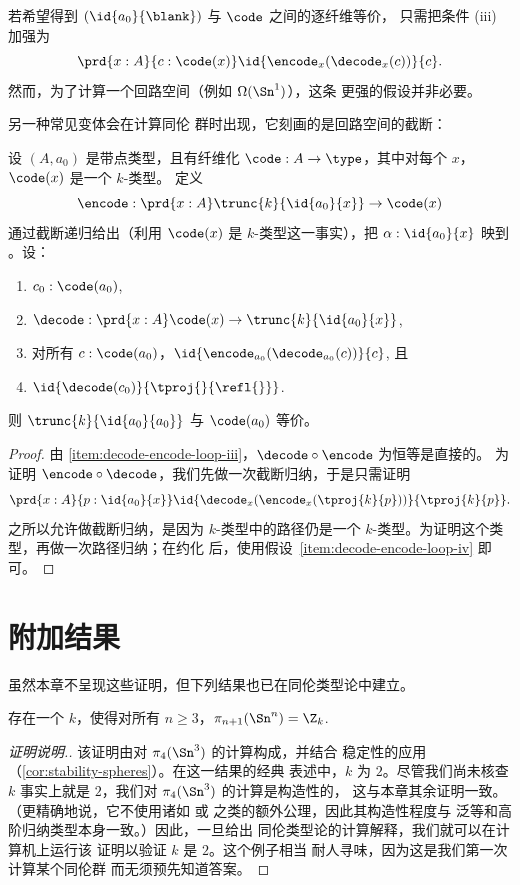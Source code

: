 若希望得到 $(\id{a_0}{\blank})$ 与 $\code$ 之间的逐纤维等价，
只需把条件 (iii) 加强为
\[
\prd{x:A}{c : \code(x)} \id{\encode_{x}(\decode_{x}(c))}{c}.
\]
然而，为了计算一个回路空间（例如 $\Omega(\Sn ^1)$），这条
更强的假设并非必要。

另一种常见变体会在计算同伦
群时出现，它刻画的是回路空间的截断：

\begin{lem}[回路空间截断的编码-解码]
设 $(A,a_0)$ 是带点类型，且有纤维化
$\code : A \to \type$，其中对每个 $x$，$\code(x)$ 是一个 $k$-类型。
定义
\[
\encode : \prd{x:A} \trunc{k}{\id{a_0}{x}} \to \code(x)
\]
通过截断递归给出（利用
$\code(x)$ 是 $k$-类型这一事实），把 $\alpha : \id{a_0}{x}$ 映到
。设：
\begin{enumerate}
\item $c_0 : \code(a_0)$,
\item $\decode : \prd{x:A} \code(x) \to \trunc{k}{\id{a_0}{x}}$,
\item \label{item:decode-encode-loop-iii}
  对所有 $c : \code(a_0)$，$\id{\encode_{a_0}(\decode_{a_0}(c))}{c}$, 且
\item \label{item:decode-encode-loop-iv}
  $\id{\decode(c_0)}{\tproj{}{\refl{}}}$.
\end{enumerate}
则 $\trunc{k}{\id{a_0}{a_0}}$ 与 $\code(a_0)$ 等价。
\end{lem}

\begin{proof}
由 \ref{item:decode-encode-loop-iii}，$\decode \circ \encode$ 为恒等是直接的。
%
为证明 $\encode \circ \decode$，我们先做一次截断归纳，于是只需证明
\[
\prd{x:A}{p : \id{a_0}{x}} \id{\decode_{x}(\encode_{x}(\tproj{k}{p}))}{\tproj{k}{p}}.
\]
之所以允许做截断归纳，是因为 $k$-类型中的路径仍是一个
$k$-类型。为证明这个类型，再做一次路径归纳；在约化
\encode 后，使用假设~\ref{item:decode-encode-loop-iv} 即可。
\end{proof}
\section{附加结果}
\label{sec:moreresults}

虽然本章不呈现这些证明，但下列结果也已在同伦类型论中建立。

\begin{thm}
存在一个 $k$，使得对所有 $n \ge 3$，$\pi_{n+1}(\Sn ^n) =
\Z_k$.
\end{thm}

\begin{proof}[证明说明.]
该证明由对 $\pi_4(\Sn ^3)$ 的计算构成，并结合
稳定性的应用（\cref{cor:stability-spheres}）。在这一结果的经典
表述中，$k$ 为 $2$。尽管我们尚未核查
$k$ 事实上就是 $2$，我们对 $\pi_4(\Sn ^3)$ 的计算是构造性的，
这与本章其余证明一致。
（更精确地说，它不使用诸如 \LEM{} 或 \choice{} 之类的额外公理，因此其构造性程度与
泛等和高阶归纳类型本身一致。）因此，一旦给出
同伦类型论的计算解释，我们就可以在计算机上运行该
证明以验证 $k$ 是 $2$。这个例子相当
耐人寻味，因为这是我们第一次计算某个同伦群
而无须预先知道答案。
\end{proof}

